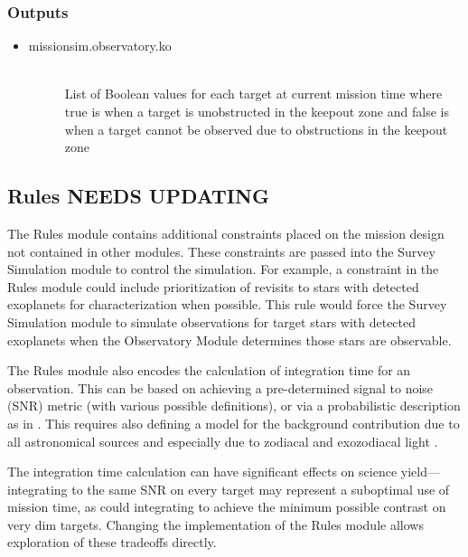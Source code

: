 \documentclass[]{asme2ej}
\begin{document}
\subsubsection*{Outputs}
\begin{itemize}
    \item 
    \begin{description}
        \item[missionsim.observatory.ko] \hfill \\
        List of Boolean values for each target at current mission time where true is when a target is unobstructed in the keepout zone and false is when a target cannot be observed due to obstructions in the keepout zone
    \end{description}
\end{itemize}


\subsection{Rules NEEDS UPDATING}
The Rules module contains additional constraints placed on the mission design not contained in other modules. These constraints are passed into the Survey Simulation module to control the simulation. For example, a constraint in the Rules module could include prioritization of revisits to stars with detected exoplanets for characterization when possible. This rule would force the Survey Simulation module to simulate observations for target stars with detected exoplanets when the Observatory Module determines those stars are observable.

The Rules module also encodes the calculation of integration time for an observation.  This can be based on achieving a pre-determined signal to noise (SNR) metric (with various possible definitions), or via a probabilistic description as in \citet{kasdin2006}.  This requires also defining a model for the background contribution due to all astronomical sources and especially due to zodiacal and exozodiacal light \citep{Stark2014}.

The integration time calculation can have significant effects on science yield---integrating to the same SNR on every target may represent a suboptimal use of mission time, as could integrating to achieve the minimum possible contrast on very dim targets.  Changing the implementation of the Rules module allows exploration of these tradeoffs directly.

\end{document}
